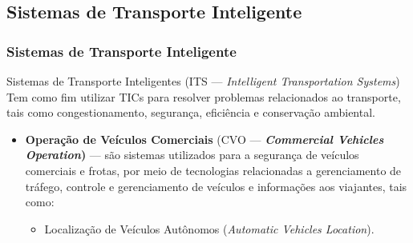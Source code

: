 \documentclass{beamer}
\begin{document}
\subsection{Sistemas de Transporte Inteligente}
\begin{frame}
\frametitle{Sistemas de Transporte Inteligente}
\begin{block}{Sistemas de Transporte Inteligentes (ITS --- \textit{Intelligent Transportation Systems})}
Tem como fim utilizar TICs para resolver problemas relacionados ao transporte, tais como congestionamento, segurança, eficiência e conservação ambiental. 
\end{block}
\begin{itemize}
\item \textbf{Operação de Veículos Comerciais} (CVO --- \textbf{\textit{Commercial Vehicles Operation})} --- são sistemas utilizados para a segurança de veículos comerciais e frotas, por meio de tecnologias relacionadas a gerenciamento de tráfego, controle e gerenciamento de veículos e informações aos viajantes, tais como:
\begin{itemize}
\item Localização de Veículos Autônomos (\textit{Automatic Vehicles Location}).
\end{itemize}
\end{itemize}
\end{frame}
\end{document}
